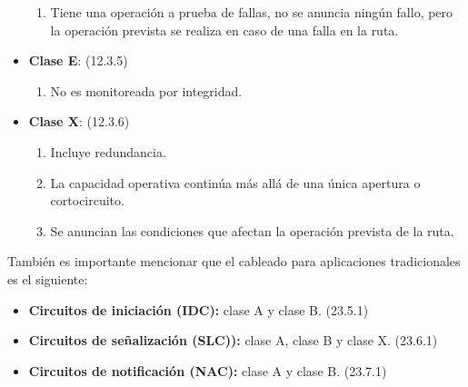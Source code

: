 \begin{itemize}
	\begin{enumerate}
	
	\item Tiene una operación a prueba de fallas, no se anuncia ningún fallo, pero la operación prevista se realiza en caso de una falla en la ruta.
	
	\end{enumerate}	
	
	\item \textbf{Clase E}: (12.3.5)
	
	\begin{enumerate}
	
	\item No es monitoreada por integridad.
	
	\end{enumerate}	



	\newpage
	
	

	
	\item \textbf{Clase X}: (12.3.6)
	
	\begin{enumerate}
	
	\item Incluye redundancia.
	
	\item La capacidad operativa continúa más allá de una única apertura o cortocircuito.
	
	\item Se anuncian las condiciones que afectan la operación prevista de la ruta.
	
	\end{enumerate}	
	
\end{itemize}

También es importante mencionar que el cableado para aplicaciones tradicionales es el siguiente:

\begin{itemize}
	
	\item \textbf{Circuitos de iniciación (IDC):} clase A y clase B. (23.5.1)
	
	\item \textbf{Circuitos de señalización (SLC)):} clase A, clase B y clase X. (23.6.1)
	
	\item \textbf{Circuitos de notificación (NAC):} clase A y clase B. (23.7.1)
	
\end{itemize}



